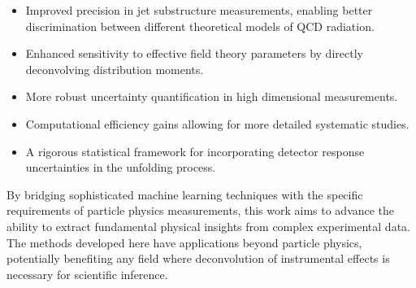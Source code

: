 \begin{itemize}
\item Improved precision in jet substructure measurements, enabling better discrimination between different theoretical models of QCD radiation.
\item Enhanced sensitivity to effective field theory parameters by directly deconvolving distribution moments.
\item More robust uncertainty quantification in high dimensional measurements.
\item Computational efficiency gains allowing for more detailed systematic studies.
\item A rigorous statistical framework for incorporating detector response uncertainties in the unfolding process.
\end{itemize}

By bridging sophisticated machine learning techniques with the specific requirements of particle physics measurements, this work aims to advance the ability to extract fundamental physical insights from complex experimental data.
%
The methods developed here have applications beyond particle physics, potentially benefiting any field where deconvolution of instrumental effects is necessary for scientific inference.